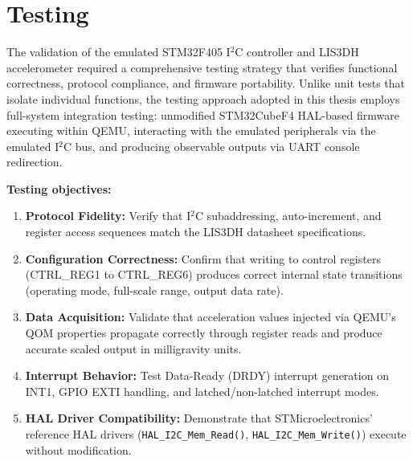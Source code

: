 \chapter{Testing}
\label{chap:testing}

The validation of the emulated STM32F405 I$^2$C controller and LIS3DH accelerometer required a comprehensive testing strategy that verifies functional correctness, protocol compliance, and firmware portability. Unlike unit tests that isolate individual functions, the testing approach adopted in this thesis employs full-system integration testing: unmodified STM32CubeF4 HAL-based firmware executing within QEMU, interacting with the emulated peripherals via the emulated I$^2$C bus, and producing observable outputs via UART console redirection.

\textbf{Testing objectives:}

\begin{enumerate}
    \item \textbf{Protocol Fidelity:} Verify that I$^2$C subaddressing, auto-increment, 
    and register access sequences match the LIS3DH datasheet specifications.
    
    \item \textbf{Configuration Correctness:} Confirm that writing to control registers \\
    (CTRL\_REG1 to CTRL\_REG6) produces correct internal state transitions 
    (operating mode, full-scale range, output data rate).
    
    \item \textbf{Data Acquisition:} Validate that acceleration values injected via 
    QEMU's QOM properties propagate correctly through register reads and produce 
    accurate scaled output in milligravity units.
    
    \item \textbf{Interrupt Behavior:} Test Data-Ready (DRDY) interrupt generation 
    on INT1, GPIO EXTI handling, and latched/non-latched interrupt modes.
    
    \item \textbf{HAL Driver Compatibility:} Demonstrate that STMicroelectronics' 
    reference HAL drivers (\texttt{HAL\_I2C\_Mem\_Read()}, 
    \texttt{HAL\_I2C\_Mem\_Write()}) execute without modification.
\end{enumerate}






